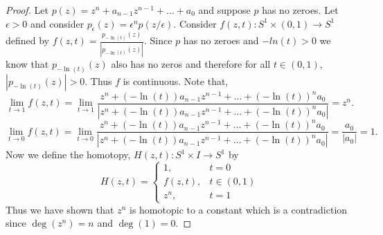 \documentclass{homework651}
\begin{document}
\begin{problems}
\begin{proof} Let $p(z) = z^n + a_{n - 1}z^{n - 1}+\dots+a_0$ and suppose $p$ has no zeroes.
    Let $\epsilon > 0$ and consider $p_{\epsilon}(z) = \epsilon^np(z/\epsilon)$. Consider $f(z,t):S^1 \times (0, 1) \to S^1$ defined by $f(z,t) = \frac{p_{-\ln(t)}(z)}{|p_{-\ln(t)}(z)|}$. Since $p$ has no zeroes and $-ln(t) > 0$ we know that $p_{-\ln(t)}(z)$ also has no zeros and therefore for all $t \in (0, 1)$, $|p_{-\ln(t)}(z)| > 0$. Thus $f$ is continuous. Note that,
    \begin{equation*}
        \lim_{t \to 1} f(z,t) = \lim_{t \to 1} \dfrac{z^n + (-\ln(t))a_{n - 1}z^{n - 1}+\dots+(-\ln(t))^n a_0}{| z^n + (-\ln(t))a_{n - 1}z^{n - 1}+\dots+ (-\ln(t))^n a_0|} = z^n.
    \end{equation*}
    \begin{equation*}
        \lim_{t \to 0} f(z,t) = \lim_{t \to 0} \dfrac{z^n + (-\ln(t))a_{n - 1}z^{n - 1}+\dots+(-\ln(t))^n a_0}{| z^n + (-\ln(t))a_{n - 1}z^{n - 1}+\dots+ (-\ln(t))^n a_0|} = \frac{a_0}{|a_0|} = 1.
    \end{equation*}
    Now we define the homotopy, $H(z, t):S^1 \times I \to S^1$ by
    \begin{equation*}
        H(z, t) = \begin{cases}
            1, & t = 0\\
            f(z, t), & t \in (0, 1)\\
            z^n, & t = 1
        \end{cases}
    \end{equation*}
    Thus we have shown that $z^n$ is homotopic to a constant which is a contradiction since $\deg(z^n) = n$ and $\deg(1) = 0$. 


\end{proof}





\end{problems}
\end{document}
